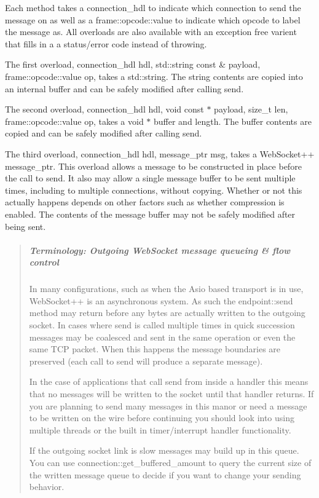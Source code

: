 Each method takes a {\ttfamily connection\+\_\+hdl} to indicate which connection to send the message on as well as a {\ttfamily frame\+::opcode\+::value} to indicate which opcode to label the message as. All overloads are also available with an exception free varient that fills in a a status/error code instead of throwing.

The first overload, {\ttfamily connection\+\_\+hdl hdl, std\+::string const \& payload, frame\+::opcode\+::value op}, takes a {\ttfamily std\+::string}. The string contents are copied into an internal buffer and can be safely modified after calling send.

The second overload, {\ttfamily connection\+\_\+hdl hdl, void const $\ast$ payload, size\+\_\+t len, frame\+::opcode\+::value op}, takes a void $\ast$ buffer and length. The buffer contents are copied and can be safely modified after calling send.

The third overload, {\ttfamily connection\+\_\+hdl hdl, message\+\_\+ptr msg}, takes a Web\+Socket++ {\ttfamily message\+\_\+ptr}. This overload allows a message to be constructed in place before the call to send. It also may allow a single message buffer to be sent multiple times, including to multiple connections, without copying. Whether or not this actually happens depends on other factors such as whether compression is enabled. The contents of the message buffer may not be safely modified after being sent.

\begin{quote}
\subparagraph*{Terminology\+: Outgoing Web\+Socket message queueing \& flow control}

In many configurations, such as when the Asio based transport is in use, Web\+Socket++ is an asynchronous system. As such the {\ttfamily endpoint\+::send} method may return before any bytes are actually written to the outgoing socket. In cases where send is called multiple times in quick succession messages may be coalesced and sent in the same operation or even the same T\+CP packet. When this happens the message boundaries are preserved (each call to send will produce a separate message).

In the case of applications that call send from inside a handler this means that no messages will be written to the socket until that handler returns. If you are planning to send many messages in this manor or need a message to be written on the wire before continuing you should look into using multiple threads or the built in timer/interrupt handler functionality.

If the outgoing socket link is slow messages may build up in this queue. You can use {\ttfamily connection\+::get\+\_\+buffered\+\_\+amount} to query the current size of the written message queue to decide if you want to change your sending behavior. \end{quote}


